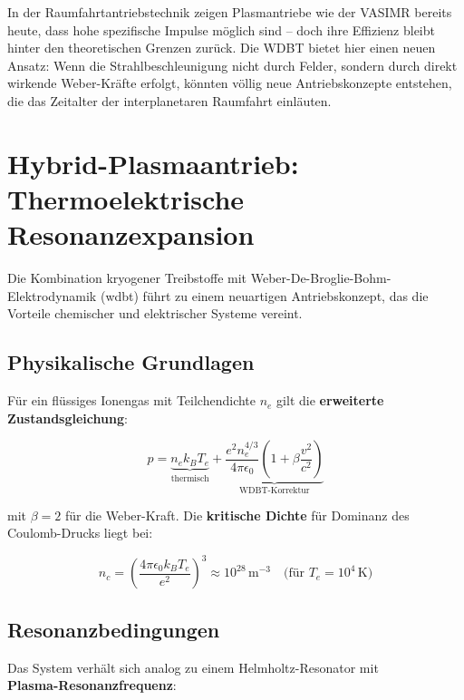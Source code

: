 In der Raumfahrtantriebstechnik zeigen Plasmantriebe wie der VASIMR bereits heute, dass hohe spezifische Impulse möglich sind – doch ihre Effizienz bleibt hinter den theoretischen
Grenzen zurück. Die WDBT bietet hier einen neuen Ansatz: Wenn die Strahlbeschleunigung nicht durch Felder, sondern durch direkt wirkende Weber-Kräfte erfolgt, könnten völlig neue
Antriebskonzepte entstehen, die das Zeitalter der interplanetaren Raumfahrt einläuten.

\section{Hybrid-Plasmaantrieb: Thermoelektrische Resonanzexpansion}
\label{sec:hybrid_antrieb}

Die Kombination kryogener Treibstoffe mit Weber-De-Broglie-Bohm-Elektrodynamik (\gls{wdbt}) führt zu einem neuartigen Antriebskonzept, das die Vorteile chemischer und elektrischer Systeme vereint.

\subsection{Physikalische Grundlagen}
\label{subsec:grundlagen}

Für ein flüssiges Ionengas mit Teilchendichte $n_e$ gilt die \textbf{erweiterte Zustandsgleichung}:

\begin{equation}
p = \underbrace{n_e k_B T_e}_{\text{thermisch}} 
+ \underbrace{\frac{e^2 n_e^{4/3}}{4\pi \epsilon_0} \left(1 + \beta \frac{v^2}{c^2}\right)}_{\text{WDBT-Korrektur}}
\label{eq:druck}
\end{equation}

mit $\beta = 2$ für die Weber-Kraft. Die \textbf{kritische Dichte} für Dominanz des Coulomb-Drucks liegt bei:

\begin{equation}
n_c = \left(\frac{4\pi \epsilon_0 k_B T_e}{e^2}\right)^3 \approx 10^{28}\,\text{m}^{-3}\quad\text{(für }T_e=10^4\,\text{K)}
\end{equation}

\subsection{Resonanzbedingungen}
\label{subsec:resonanz}

Das System verhält sich analog zu einem Helmholtz-Resonator mit\\\textbf{Plasma-Resonanzfrequenz}:

